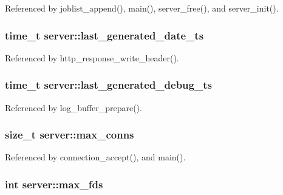 Referenced by joblist\-\_\-append(), main(), server\-\_\-free(), and server\-\_\-init().

\hypertarget{structserver_aa496454b890b5139ef460be1834b8008}{
\subsubsection[{last\-\_\-generated\-\_\-date\-\_\-ts}]{\setlength{\rightskip}{0pt plus 5cm}time\-\_\-t server\-::last\-\_\-generated\-\_\-date\-\_\-ts}}\label{structserver_aa496454b890b5139ef460be1834b8008}


Referenced by http\-\_\-response\-\_\-write\-\_\-header().

\hypertarget{structserver_a538c428e737fc2eefca26c07bc1b18ff}{
\subsubsection[{last\-\_\-generated\-\_\-debug\-\_\-ts}]{\setlength{\rightskip}{0pt plus 5cm}time\-\_\-t server\-::last\-\_\-generated\-\_\-debug\-\_\-ts}}\label{structserver_a538c428e737fc2eefca26c07bc1b18ff}


Referenced by log\-\_\-buffer\-\_\-prepare().

\hypertarget{structserver_ae12b18e6b224508b0c180d05de909a1b}{
\subsubsection[{max\-\_\-conns}]{\setlength{\rightskip}{0pt plus 5cm}size\-\_\-t server\-::max\-\_\-conns}}\label{structserver_ae12b18e6b224508b0c180d05de909a1b}


Referenced by connection\-\_\-accept(), and main().

\hypertarget{structserver_a1240887eef32a47b45b92d75c7db35c4}{
\subsubsection[{max\-\_\-fds}]{\setlength{\rightskip}{0pt plus 5cm}int server\-::max\-\_\-fds}}\label{structserver_a1240887eef32a47b45b92d75c7db35c4}


